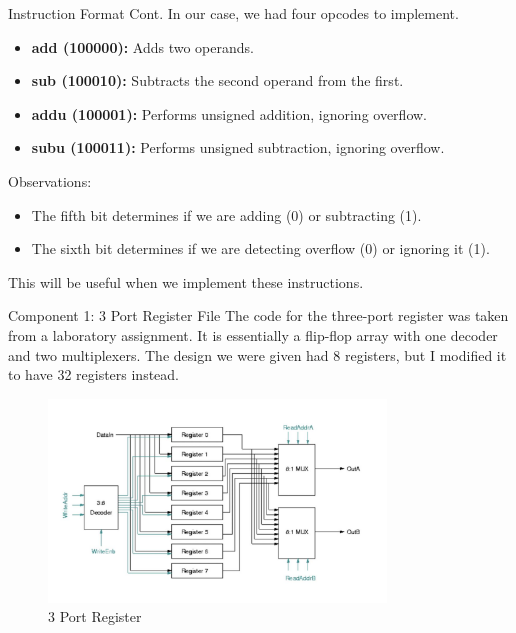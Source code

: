 \documentclass{beamer}
\begin{document}
\begin{frame}{Instruction Format Cont.}
    In our case, we had four opcodes to implement.
\begin{itemize}
  \item \textbf{add (100000):} Adds two operands.
  \item \textbf{sub (100010):} Subtracts the second operand from the first.
  \item \textbf{addu (100001):} Performs unsigned addition, ignoring overflow.
  \item \textbf{subu (100011):} Performs unsigned subtraction, ignoring overflow.
\end{itemize}
Observations:
\begin{itemize}
    \item The fifth bit determines if we are adding (0) or subtracting (1).
    \item The sixth bit determines if we are detecting overflow (0) or ignoring it (1).
\end{itemize}
This will be useful when we implement these instructions.
\end{frame}
\begin{frame}[containsverbatim]{Component 1: 3 Port Register File}
    The code for the three-port register was taken from a laboratory assignment.
    It is essentially a flip-flop array with one decoder and two multiplexers. The design we were given had 8 registers, but I modified it to have 32 registers instead.
    \begin{figure}[ht]
        \centering
        \includegraphics[width=0.8\textwidth]{./images/register.png}
        \caption{3 Port Register}
      \end{figure}
\end{frame}
\end{document}
